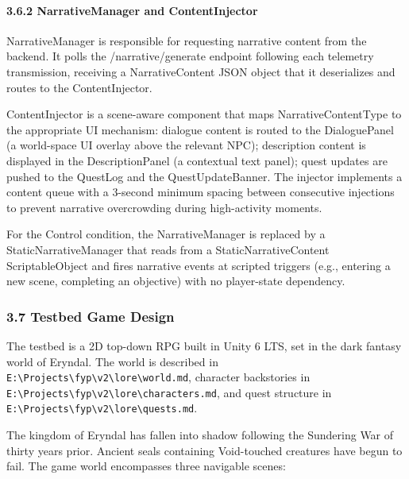 \paragraph{3.6.2 NarrativeManager and
ContentInjector}\label{narrativemanager-and-contentinjector}

NarrativeManager is responsible for requesting narrative content from
the backend. It polls the /narrative/generate endpoint following each
telemetry transmission, receiving a NarrativeContent JSON object that it
deserializes and routes to the ContentInjector.

ContentInjector is a scene-aware component that maps
NarrativeContentType to the appropriate UI mechanism: dialogue content
is routed to the DialoguePanel (a world-space UI overlay above the
relevant NPC); description content is displayed in the DescriptionPanel
(a contextual text panel); quest updates are pushed to the QuestLog and
the QuestUpdateBanner. The injector implements a content queue with a
3-second minimum spacing between consecutive injections to prevent
narrative overcrowding during high-activity moments.

For the Control condition, the NarrativeManager is replaced by a
StaticNarrativeManager that reads from a StaticNarrativeContent
ScriptableObject and fires narrative events at scripted triggers (e.g.,
entering a new scene, completing an objective) with no player-state
dependency.

\subsubsection{3.7 Testbed Game Design}\label{testbed-game-design}

The testbed is a 2D top-down RPG built in Unity 6 LTS, set in the dark
fantasy world of Eryndal. The world is described in
\texttt{E:\textbackslash{}Projects\textbackslash{}fyp\textbackslash{}v2\textbackslash{}lore\textbackslash{}world.md},
character backstories in
\texttt{E:\textbackslash{}Projects\textbackslash{}fyp\textbackslash{}v2\textbackslash{}lore\textbackslash{}characters.md},
and quest structure in
\texttt{E:\textbackslash{}Projects\textbackslash{}fyp\textbackslash{}v2\textbackslash{}lore\textbackslash{}quests.md}.

The kingdom of Eryndal has fallen into shadow following the Sundering
War of thirty years prior. Ancient seals containing Void-touched
creatures have begun to fail. The game world encompasses three navigable
scenes:

